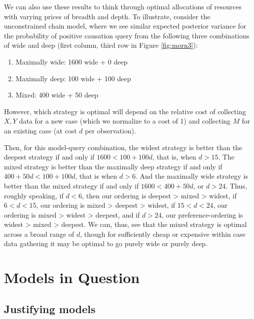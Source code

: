 \documentclass[
  12pt,
]{book}
\providecommand{\tightlist}{%
  \setlength{\itemsep}{0pt}\setlength{\parskip}{0pt}}
\begin{document}
We can also use these results to think through optimal allocations of resources with varying prices of breadth and depth. To illustrate, consider the unconstrained chain model, where we see similar expected posterior variance for the probability of positive causation query from the following three combinations of wide and deep (first column, third row in Figure \ref{fig:morn3}):

\begin{enumerate}
\def\labelenumi{\arabic{enumi}.}
\tightlist
\item
  Maximally wide: 1600 wide + 0 deep
\item
  Maximally deep: 100 wide + 100 deep
\item
  Mixed: 400 wide + 50 deep
\end{enumerate}

However, which strategy is optimal will depend on the relative cost of collecting \(X,Y\) data for a new case (which we normalize to a cost of 1) and collecting \(M\) for an existing case (at cost \(d\) per observation).

Then, for this model-query combination, the widest strategy is better than the deepest strategy if and only if \(1600 < 100 + 100d\), that is, when \(d > 15\). The mixed strategy is better than the maximally deep strategy if and only if \(400 + 50d < 100 + 100d\), that is when \(d > 6\). And the maximally wide strategy is better than the mixed strategy if and only if \(1600 < 400 + 50d\), or \(d > 24\). Thus, roughly speaking, if \(d < 6\), then our ordering is deepest \textgreater{} mixed \textgreater{} widest, if \(6 < d < 15\), our ordering is mixed \textgreater{} deepest \textgreater{} widest, if \(15 < d < 24\), our ordering is mixed \textgreater{} widest \textgreater{} deepest, and if \(d > 24\), our preference-ordering is widest \textgreater{} mixed \textgreater{} deepest. We can, thus, see that the mixed strategy is optimal across a broad range of \(d\), though for sufficiently cheap or expensive within case data gathering it may be optimal to go purely wide or purely deep.

\hypertarget{part-models-in-question}{%
\part{Models in Question}\label{part-models-in-question}}

\hypertarget{justifying}{%
\chapter{Justifying models}\label{justifying}}
\end{document}
